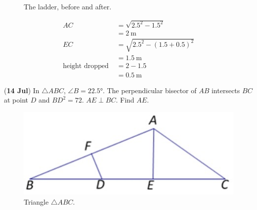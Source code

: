\documentclass[12pt,answers]{exam}
\newcommand{\qndate}[2]{(\textbf{#1 #2})}
\begin{document}
\begin{questions}
  \begin{figure}[htpb]
    \centering
    \label{fig:Ladder}
    \caption{The ladder, before and after.}
  \end{figure}

  \begin{solution}
    \begin{align*}
      AC                     & = \sqrt{{2.5}^2 - {1.5}^2}                    \\
      & = \qty{2}{\metre}                             \\
      EC                     & = \sqrt{{2.5}^2 - {\left(1.5 + 0.5\right)}^2} \\
      & = \qty{1.5}{\metre}                           \\
      \text{height dropped } & = 2 - 1.5                                     \\
      & = \qty{0.5}{\metre}
    \end{align*}
  \end{solution}

  \question \qndate{14}{Jul} In $\triangle ABC$, $\angle B = \ang{22.5}$. The
  perpendicular bisector of $AB$ intersects $BC$ at point $D$ and ${BD}^2 = 72$.
  $AE \perp BC$. Find $AE$.
  \begin{figure}[htpb]
    \centering
    \includegraphics[scale=0.5]{./images/0714_Tri.jpeg}
    \caption{Triangle $\triangle ABC$.}
    \label{fig:0714_Tri}
  \end{figure}


\end{questions}
\end{document}
